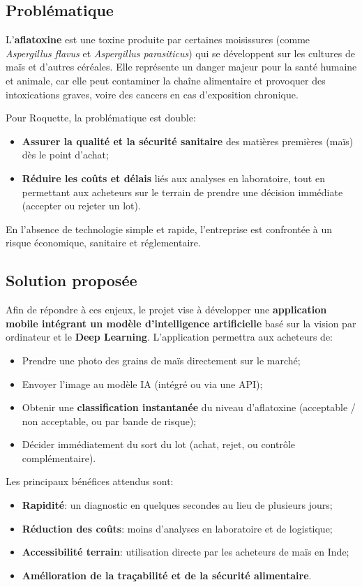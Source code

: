 \documentclass[12pt,a4paper]{report}
\begin{document}
\subsection{Problématique} %
L’\textbf{aflatoxine} est une toxine produite par certaines moisissures (comme \textit{Aspergillus flavus} et \textit{Aspergillus parasiticus}) qui se développent sur les cultures de maïs et d’autres céréales.
Elle représente un danger majeur pour la santé humaine et animale, car elle peut contaminer la chaîne alimentaire et provoquer des intoxications graves, voire des cancers en cas d’exposition chronique.

Pour Roquette, la problématique est double:
\begin{itemize}
    \item \textbf{Assurer la qualité et la sécurité sanitaire} des matières premières (maïs) dès le point d’achat;
    \item \textbf{Réduire les coûts et délais} liés aux analyses en laboratoire, tout en permettant aux acheteurs sur le terrain de prendre une décision immédiate (accepter ou rejeter un lot).
\end{itemize}

En l’absence de technologie simple et rapide, l’entreprise est confrontée à un risque économique, sanitaire et réglementaire.

\subsection{Solution proposée} %
Afin de répondre à ces enjeux, le projet vise à développer une \textbf{application mobile intégrant un modèle d’intelligence artificielle} basé sur la vision par ordinateur et le \textbf{Deep Learning}.
L’application permettra aux acheteurs de:
\begin{itemize}
    \item Prendre une photo des grains de maïs directement sur le marché;
    \item Envoyer l’image au modèle IA (intégré ou via une API);
    \item Obtenir une \textbf{classification instantanée} du niveau d’aflatoxine (acceptable / non acceptable, ou par bande de risque);
    \item Décider immédiatement du sort du lot (achat, rejet, ou contrôle complémentaire).
\end{itemize}

Les principaux bénéfices attendus sont:
\begin{itemize}
    \item \textbf{Rapidité}: un diagnostic en quelques secondes au lieu de plusieurs jours;
    \item \textbf{Réduction des coûts}: moins d’analyses en laboratoire et de logistique;
    \item \textbf{Accessibilité terrain}: utilisation directe par les acheteurs de maïs en Inde;
    \item \textbf{Amélioration de la traçabilité et de la sécurité alimentaire}.
\end{itemize}
\end{document}
